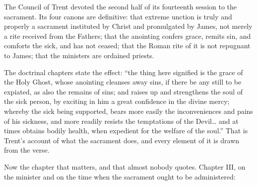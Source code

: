 The Council of Trent devoted the second half of its fourteenth session to the sacrament. Its four canons are definitive: that extreme unction is truly and properly a sacrament instituted by Christ and promulgated by James, not merely a rite received from the Fathers; that the anointing confers grace, remits sin, and comforts the sick, and has not ceased; that the Roman rite of it is not repugnant to James; that the ministers are ordained priests.

The doctrinal chapters state the effect: ``the thing here signified is the grace of the Holy Ghost, whose anointing cleanses away sins, if there be any still to be expiated, as also the remains of sins; and raises up and strengthens the soul of the sick person, by exciting in him a great confidence in the divine mercy; whereby the sick being supported, bears more easily the inconveniences and pains of his sickness, and more readily resists the temptations of the Devil\ldots{} and at times obtains bodily health, when expedient for the welfare of the soul.'' That is Trent's account of what the sacrament does, and every element of it is drawn from the verse.

Now the chapter that matters, and that almost nobody quotes. Chapter III, on the minister and on the time when the sacrament ought to be administered:


